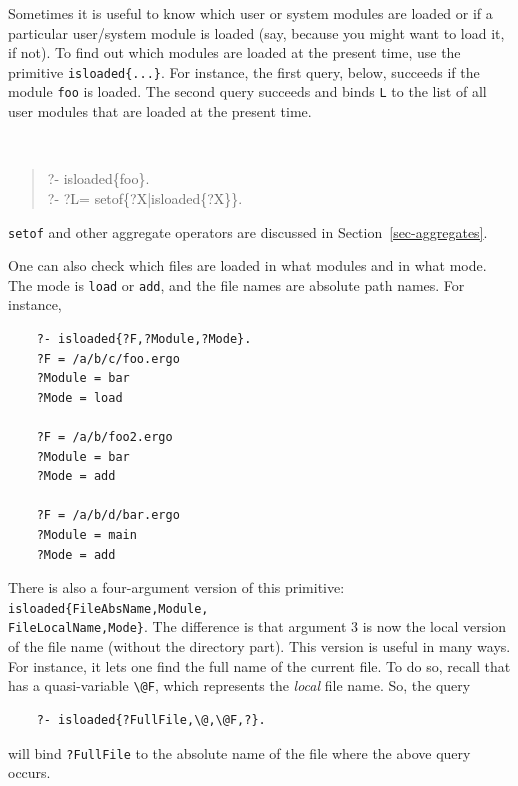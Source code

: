 \documentclass[11pt]{article}
\newcommand{\ERGO}{\mbox{\smaller{\ensuremath{\cal{E}}\smaller{{\sc{RGO}}}}}\xspace}
\newcommand{\FLSYSTEM}{\ERGO}
\newcommand{\bs}{\textbackslash}
\begin{document}
Sometimes it is useful to know which user or system modules are loaded or if a
particular user/system module is loaded (say, because you might want to load it,
if not).  To find out which modules are loaded at the present time, use the
primitive {\tt isloaded\{...\}}. For instance, the first query,
below, succeeds if the module {\tt foo} is loaded. The second query
succeeds and binds {\tt L} to the list of all user modules that are loaded
at the present time.
{\tt
\begin{quote}
 ?- isloaded\{foo\}.\\
 ?- ?L= setof\{?X|isloaded\{?X\}\}.
\end{quote}
}
\texttt{setof} and other aggregate operators are discussed in
Section~\ref{sec-aggregates}.

One can also check which files are loaded in what modules and in what mode.
The mode is \texttt{load} or \texttt{add}, and the file names are absolute
path names. For instance, 
\begin{verbatim}
    ?- isloaded{?F,?Module,?Mode}.
    ?F = /a/b/c/foo.ergo
    ?Module = bar
    ?Mode = load

    ?F = /a/b/foo2.ergo
    ?Module = bar
    ?Mode = add

    ?F = /a/b/d/bar.ergo
    ?Module = main
    ?Mode = add
\end{verbatim}

There is also a four-argument version of this primitive:
\texttt{isloaded\{FileAbsName,Module,\\FileLocalName,Mode\}}. The difference
is that argument 3 is now the local version of the file name (without the
directory part). This version is useful in many ways. For instance, it lets
one find the full name of the current file. To do so, recall that \FLSYSTEM
has a quasi-variable \texttt{\bs{}@F}, which represents the \emph{local}
file name. So, the query
\begin{verbatim}
    ?- isloaded{?FullFile,\@,\@F,?}.
\end{verbatim}
will bind \texttt{?FullFile} to the absolute name of the file where the
above query occurs.
\end{document}
